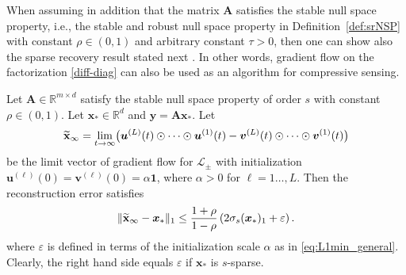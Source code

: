 \documentclass{svproc}
\newcommand{\corr}[1]{#1}
\newcommand{\bA}{\boldsymbol{A}}
\newcommand{\bu}{\boldsymbol{u}}
\newcommand{\bv}{\boldsymbol{v}}
\newcommand{\bx}{\boldsymbol{x}}
\newcommand{\by}{\boldsymbol{y}}
\newcommand{\0}{\boldsymbol{0}}
\newcommand{\1}{\boldsymbol{1}}
\renewcommand{\tilde}{\widetilde}
\renewcommand{\epsilon}{\varepsilon}
\def\xprod{\tilde{\bf x}}
\def\xprodinfty{\xprod_\infty}
\begin{document}
When assuming in addition that the matrix $\bA$ satisfies the stable null space property, i.e., the stable and robust null space property in Definition~\ref{def:srNSP} with constant $\rho \in (0,1)$ and arbitrary constant $\tau > 0$, then one can show also the sparse recovery result stated next \cite{chou2023more}. In other words, gradient flow on the factorization \eqref{diff-diag} can also be used as an algorithm for compressive sensing.
\begin{theorem}
Let $\bA \in \mathbb{R}^{m \times d}$ satisfy the stable null space property of order $s$ with constant $\rho\in(0,1)$.
Let $\bx_* \in \mathbb{R}^{d}$ and $\by = \bA\bx_*$.
Let 
\[
\xprod_\infty = \lim_{t \to \infty} \corr{\bigl(\bu^{(L)}(t) \odot \cdots \odot \bu^{(1)}(t) - \bv^{(L)}(t) \odot \cdots \odot \bv^{(1)}(t)\bigr)}
\]
be the limit vector of gradient flow for $\mathcal{L}_{\pm}$ with initialization $\bu^{(\ell)}(0) = \bv^{(\ell)}(0) = \alpha\1$, where $\alpha > 0$ for $\ell=1\hdots,L$.
   Then the reconstruction error satisfies
    \begin{align*}
        \|\xprod_\infty - \bx_*\|_1
        \leq  \frac{1+\rho}{1-\rho}\left( 2\sigma_{s}(\bx_*)_1 + \epsilon\right).
    \end{align*}
where $\epsilon$ is defined in terms of the initialization scale $\alpha$ as in
\eqref{eq:L1min_general}.
    Clearly, the right hand side equals $\epsilon$ if $\bx_*$ is $s$-sparse.
\end{theorem}
\end{document}
